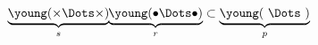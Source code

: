 \begin{equation}
\underbrace{\young(\times \Dots \times )}_{s}\kern -2.5pt
\underbrace{\young(\bullet \Dots \bullet )}_{r}
\subset\underbrace{\young(\ \Dots \ )}_{p}
\end{equation}

